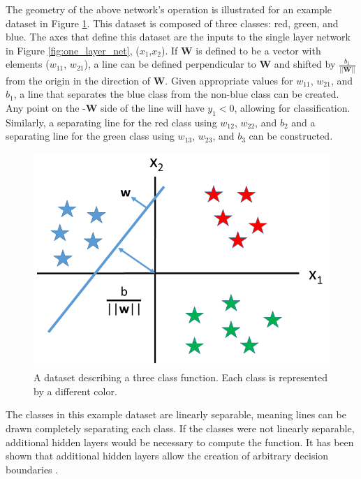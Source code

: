 %
The geometry of the above network's operation is illustrated for an example dataset in Figure \ref{fig:training_set_one_layer}. This dataset is composed of three classes: red, green, and blue. The axes that define this dataset are the inputs to the single layer network in Figure \ref{fig:one_layer_net}, ($x_1$,$x_2$). If $\mathbf{W}$ is defined to be a vector with elements ($w_{11}$, $w_{21}$), a line can be defined perpendicular to $\mathbf{W}$ and shifted by $\frac{b_1}{||\mathbf{W}||}$ from the origin in the direction of $\mathbf{W}$. Given appropriate values for $w_{11}$, $w_{21}$, and $b_1$, a line that separates the blue class from the non-blue class can be created. Any point on the -$\mathbf{W}$ side of the line will have $y_1 < 0$, allowing for classification. Similarly, a separating line for the red class using $w_{12}$, $w_{22}$, and $b_2$ and a separating line for the green class using $w_{13}$, $w_{23}$, and $b_3$ can be constructed. 
\begin{figure}[H]
	\centering
	\includegraphics[width=0.65\linewidth]{images/training_set_for_single_layer_hyperplane_v2}
	\caption{A dataset describing a three class function. Each class is represented by a different color.}
	\label{fig:training_set_one_layer}
\end{figure}

The classes in this example dataset are linearly separable, meaning lines can be drawn completely separating each class. If the classes were not linearly separable, additional hidden layers would be necessary to compute the function. It has been shown that additional hidden layers allow the creation of arbitrary decision boundaries \cite{Hornik1991}. 


